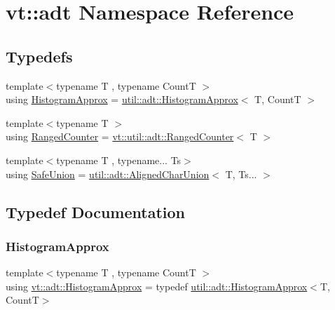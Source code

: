 \hypertarget{namespacevt_1_1adt}{}\section{vt\+:\+:adt Namespace Reference}
\label{namespacevt_1_1adt}
\subsection*{Typedefs}
\begin{DoxyCompactItemize}
\item 
{\footnotesize template$<$typename T , typename CountT $>$ }\\using \hyperlink{namespacevt_1_1adt_a486971e142bc22434d6afe695c43b599}{Histogram\+Approx} = \hyperlink{structvt_1_1util_1_1adt_1_1_histogram_approx}{util\+::adt\+::\+Histogram\+Approx}$<$ T, CountT $>$
\item 
{\footnotesize template$<$typename T $>$ }\\using \hyperlink{namespacevt_1_1adt_a075b41b03183cb280d453f44d5397637}{Ranged\+Counter} = \hyperlink{structvt_1_1util_1_1adt_1_1_ranged_counter}{vt\+::util\+::adt\+::\+Ranged\+Counter}$<$ T $>$
\item 
{\footnotesize template$<$typename T , typename... Ts$>$ }\\using \hyperlink{namespacevt_1_1adt_ad2a7bbcb5f4735ae9d847f96ee62f144}{Safe\+Union} = \hyperlink{structvt_1_1util_1_1adt_1_1_aligned_char_union}{util\+::adt\+::\+Aligned\+Char\+Union}$<$ T, Ts... $>$
\end{DoxyCompactItemize}


\subsection{Typedef Documentation}
\mbox{\label{namespacevt_1_1adt_a486971e142bc22434d6afe695c43b599}} 
\subsubsection{\texorpdfstring{Histogram\+Approx}{HistogramApprox}}
{\footnotesize\ttfamily template$<$typename T , typename CountT $>$ \\
using \hyperlink{namespacevt_1_1adt_a486971e142bc22434d6afe695c43b599}{vt\+::adt\+::\+Histogram\+Approx} = typedef \hyperlink{structvt_1_1util_1_1adt_1_1_histogram_approx}{util\+::adt\+::\+Histogram\+Approx}$<$T, CountT$>$}

